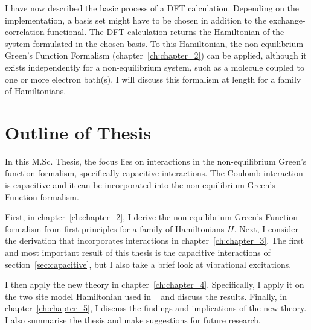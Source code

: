 I have now described the basic process of a DFT calculation. Depending on the implementation, a basis set might have to be chosen in addition to the exchange\hyp{}correlation functional. The DFT calculation returns the Hamiltonian of the system formulated in the chosen basis. To this Hamiltonian, the non-equilibrium Green's Function Formalism (chapter~\ref{ch:chapter_2}) can be applied, although it exists independently for a non-equilibrium system, such as a molecule coupled to one or more electron bath(s). I will discuss this formalism at length for a family of Hamiltonians.

\section{Outline of Thesis}
In this M.Sc. Thesis, the focus lies on interactions in the non-equilibrium Green's function formalism, specifically capacitive interactions. The Coulomb interaction is capacitive and it can be incorporated into the non-equilibrium Green's Function formalism.

First, in chapter~\ref{ch:chapter_2}, I derive the non-equilibrium Green's Function formalism from first principles for a family of Hamiltonians $H$. Next, I consider the derivation that incorporates interactions in chapter~\ref{ch:chapter_3}. The first and most important result of this thesis is the capacitive interactions of section~\ref{sec:capacitive}, but I also take a brief look at vibrational excitations.

I then apply the new theory  in chapter~\ref{ch:chapter_4}. Specifically, I apply it on the two site model Hamiltonian used in ~\citet{perrinnano} and discuss the results. Finally, in chapter~\ref{ch:chapter_5}, I discuss the findings and implications of the new theory. I also summarise the thesis and make suggestions for future research.

\clearpage
{}